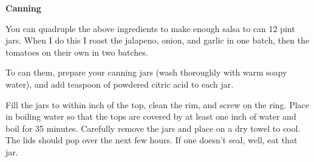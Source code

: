 \documentclass{article}
\begin{document}
\bigskip

\textbf{Canning}

You can quadruple the above ingredients to make enough salsa to can 12 pint
jars. When I do this I roast the jalapeno, onion, and garlic in one batch,
then the tomatoes on their own in two batches.

To can them, prepare your canning jars (wash thoroughly with warm soapy
water), and add  teaspoon of powdered citric acid to each jar.

Fill the jars to within  inch of the top, clean the rim, and screw
on the ring. Place in boiling water so that the tops are covered by at
least one inch of water and boil for 35 minutes. Carefully remove the
jars and place on a dry towel to cool. The lids should pop over the next
few hours. If one doesn't seal, well, eat that jar.


\end{document}
